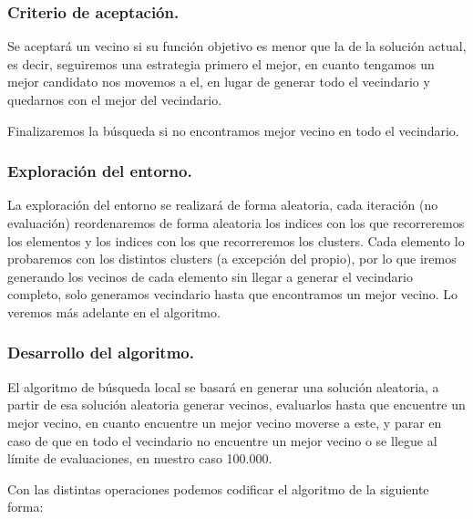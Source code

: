 \documentclass[12pt, spanish]{article}
\begin{document}
\subsubsection{Criterio de aceptación.}

Se aceptará un vecino si su función objetivo es menor que la de la solución actual, es decir, seguiremos una estrategia primero el mejor, en cuanto tengamos un mejor candidato nos movemos a el, en lugar de generar todo el vecindario y quedarnos con el mejor del vecindario.

Finalizaremos la búsqueda si no encontramos mejor vecino en todo el vecindario.

\subsubsection{Exploración del entorno.}

La exploración del entorno se realizará de forma aleatoria, cada iteración (no evaluación) reordenaremos de forma aleatoria los indices con los que recorreremos los elementos y los indices con los que recorreremos los clusters. Cada elemento lo probaremos con los distintos clusters (a excepción del propio), por lo que iremos generando los vecinos de cada elemento sin llegar a generar el vecindario completo, solo generamos vecindario hasta que encontramos un mejor vecino. Lo veremos más adelante en el algoritmo.

\subsubsection{Desarrollo del algoritmo.}

El algoritmo de búsqueda local se basará en generar una solución aleatoria, a partir de esa solución aleatoria generar vecinos, evaluarlos hasta que encuentre un mejor vecino, en cuanto encuentre un mejor vecino moverse a este, y parar en caso de que en todo el vecindario no encuentre un mejor vecino o se llegue al límite de evaluaciones, en nuestro caso 100.000.


Con las distintas operaciones podemos codificar el algoritmo de la siguiente forma:
\end{document}
